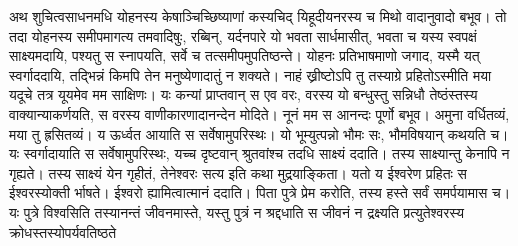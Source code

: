 \vakya अथ शुचित्वसाधनमधि योहनस्य केषाञ्चिच्छिष्याणां कस्यचिद् यिहूदीयनरस्य च मिथो वादानुवादो बभूव।
\vakya तो तदा योहनस्य समीपमागत्य तमवादिषुः, रब्बिन्, यर्दनपारे यो भवता सार्धमासीत्, भवता च यस्य स्वपक्षं साक्ष्यमदायि, पश्यतु स स्नापयति, सर्वे च तत्समीपमुपतिष्ठन्ते।
\vakya योहनः प्रतिभाषमाणो जगाद, यस्मै यत् स्वर्गाददायि, तद्भिन्नं किमपि तेन मनुष्येणादातुं न शक्यते।
\vakya नाहं ख्रीष्टोऽपि तु तस्याग्रे प्रहितोऽस्मीति मया यदूचे तत्र यूयमेव मम साक्षिणः।
\vakya यः कन्यां प्राप्तवान् स एव वरः, वरस्य यो बन्धुस्तु सन्निधौ तेष्ठंस्तस्य वाक्यान्याकर्णयति, स वरस्य वाणीकारणादानन्देन मोदिते। नूनं मम स आनन्दः पूर्णो बभूव।
\vakya अमुना वर्धितव्यं, मया तु ह्रसितव्यं।
\vakya य ऊर्ध्वत आयाति स सर्वेषामुपरिस्थः। यो भूम्युत्पन्नो भौमः सः, भौमविषयान् कथयति च।
\vakya यः स्वर्गादायाति स सर्वेषामुपरिस्थः, यच्च दृष्टवान् श्रुतवांश्च तदधि साक्ष्यं ददाति।
\vakya तस्य साक्ष्यान्तु केनापि न गृह्यते। तस्य साक्ष्यं येन गृहीतं, तेनेश्वरः सत्य इति कथा मुद्रयाङ्किता।
\vakya यतो य ईश्वरेण प्रहितः स ईश्वरस्योक्ती र्भाषते। ईश्वरो ह्यामित्वात्मानं ददाति।
\vakya पिता पुत्रे प्रेम करोति, तस्य हस्ते सर्वं समर्पयामास च।
\vakya यः पुत्रे विश्वसिति तस्यानन्तं जीवनमास्ते, यस्तु पुत्रं न श्रद्दधाति स जीवनं न द्रक्ष्यति प्रत्युतेश्वरस्य क्रोधस्तस्योपर्यवतिष्ठते\eoc